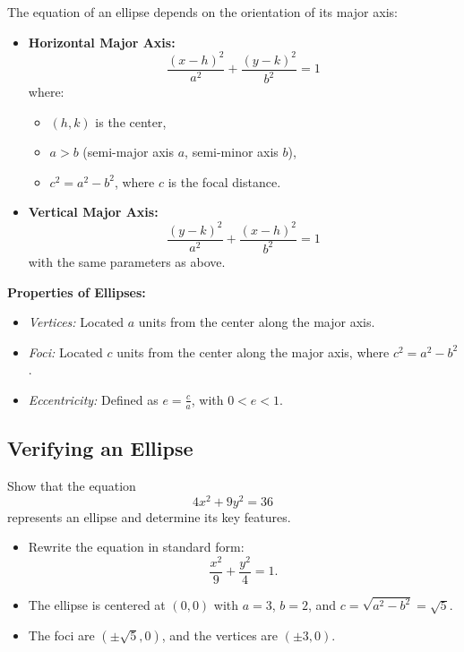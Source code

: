 \documentclass{article}
\begin{document}
\begin{definitionbox}
The equation of an ellipse depends on the orientation of its major axis:

\begin{itemize}
    \item \textbf{Horizontal Major Axis:}  
    \[
    \frac{(x-h)^2}{a^2} + \frac{(y-k)^2}{b^2} = 1
    \]
    where:
    \begin{itemize}
        \item \( (h, k) \) is the center,
        \item \( a > b \) (semi-major axis \( a \), semi-minor axis \( b \)),
        \item \( c^2 = a^2 - b^2 \), where \( c \) is the focal distance.
    \end{itemize}
    
    \item \textbf{Vertical Major Axis:}  
    \[
    \frac{(y-k)^2}{a^2} + \frac{(x-h)^2}{b^2} = 1
    \]
    with the same parameters as above.
\end{itemize}
\begin{remarkbox}
    \textbf{Properties of Ellipses:}
    \begin{itemize}
        \item \textit{Vertices:} Located \( a \) units from the center along the major axis.
        \item \textit{Foci:} Located \( c \) units from the center along the major axis, where \( c^2 = a^2 - b^2 \).
        \item \textit{Eccentricity:} Defined as \( e = \frac{c}{a} \), with \( 0 < e < 1 \).
    \end{itemize}
    \end{remarkbox}
\end{definitionbox}

\subsection*{Verifying an Ellipse}
\begin{examplebox} 
Show that the equation  
\[
4x^2 + 9y^2 = 36
\]
represents an ellipse and determine its key features.

\begin{solutionbox}
\begin{itemize}
    \item Rewrite the equation in standard form:
    \[
    \frac{x^2}{9} + \frac{y^2}{4} = 1.
    \]
    \item The ellipse is centered at \( (0, 0) \) with \( a = 3 \), \( b = 2 \), and \( c = \sqrt{a^2 - b^2} = \sqrt{5} \).
    \item The foci are \( (\pm \sqrt{5}, 0) \), and the vertices are \( (\pm 3, 0) \).
\end{itemize}
\end{solutionbox}
\end{examplebox}
\end{document}
